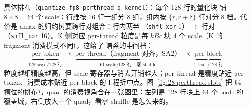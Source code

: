 具体排布（\texttt{quantize\_fp8\_perthread\_q\_kernel}）：每个 128 行的量化块
铺 $8\times 8 = 64$ 个 scale：行维按 16 行一组分 8 组，组内按
$\{r,r+8\}$ 行对分 8 档。代价是 amax 的归约树要跨行对组合：行内两半
（\texttt{shfl\_xor} 1）$\to$ 行对（\texttt{shfl\_xor} 16）。K 侧对应
per-thread 粒度是每 $kBc$ 块 4 个 scale（K 的 fragment 消费模式不同）。这给了
谱系的中间档：
\begin{equation}
  \underbrace{\text{per-token}}_{\text{128 scale/128 行}}
  \;\prec\;
  \underbrace{\text{per-thread（fragment 对齐，SA2）}}_{\text{64 scale/128 行，零 shuffle}}
  \;\prec\;
  \underbrace{\text{per-block}}_{\text{1 scale/128 行}}
\end{equation}
粒度越细精度越高，但 scale 寄存器与消去开销越大；per-thread 是精度贴近
per-token、消费成本贴近 per-block 的工程折中点。图~\ref{fig:28-perthread-slots}
把 64 槽位的排布与 quad 的消费视角合在一张图里：左列是 128 行块上 64 个
scale 的覆盖域，右侧放大一个 quad，看零 shuffle 是怎么来的。

